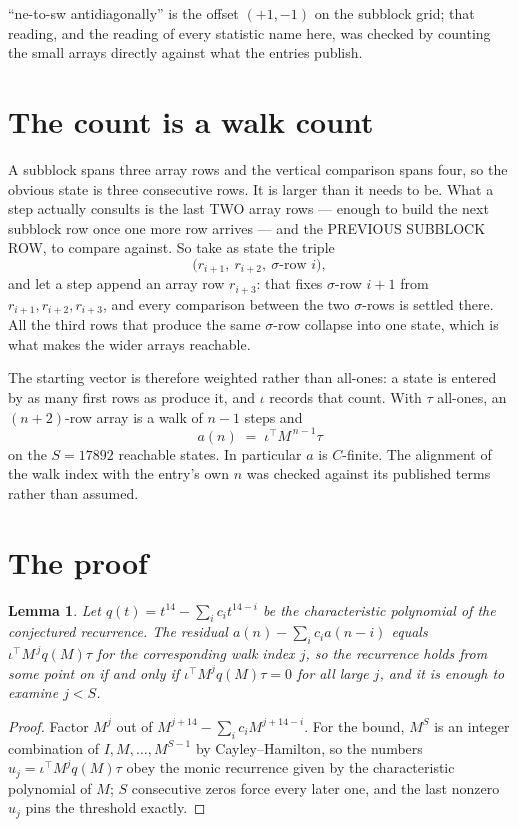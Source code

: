 \documentclass[11pt,a4paper]{article}
\theoremstyle{plain}
\newtheorem{lemma}[theorem]{Lemma}
\theoremstyle{definition}
\begin{document}
``ne-to-sw antidiagonally'' is the offset $(+1,-1)$ on the subblock grid; that reading, and
the reading of every statistic name here, was checked by counting the small arrays directly
against what the entries publish.

\section{The count is a walk count}

A subblock spans three array rows and the vertical comparison spans four, so the obvious state
is three consecutive rows. It is larger than it needs to be. What a step actually consults is
the last TWO array rows --- enough to build the next subblock row once one more row arrives ---
and the PREVIOUS SUBBLOCK ROW, to compare against. So take as state the triple
\[
\bigl(r_{i+1},\ r_{i+2},\ \sigma\text{-row }i\bigr),
\]
and let a step append an array row $r_{i+3}$: that fixes $\sigma$-row $i+1$ from
$r_{i+1},r_{i+2},r_{i+3}$, and every comparison between the two $\sigma$-rows is settled
there. All the third rows that produce the same $\sigma$-row collapse into one state, which is
what makes the wider arrays reachable.

The starting vector is therefore weighted rather than all-ones: a state is entered by as many
first rows as produce it, and $\iota$ records that count. With $\tau$ all-ones, an
$(n+2)$-row array is a walk of $n-1$ steps and
\[
a(n)\;=\;\iota^{\!\top}M^{\,n-1}\tau
\]
on the $S=17892$ reachable states. In particular $a$ is $C$-finite. The alignment of the walk
index with the entry's own $n$ was checked against its published terms rather than assumed.

\section{The proof}

\begin{lemma}\label{lem:crit}
Let $q(t)=t^{14}-\sum_i c_it^{14-i}$ be the characteristic polynomial of the
conjectured recurrence. The residual $a(n)-\sum_ic_ia(n-i)$ equals
$\iota^{\!\top}M^{\,j}q(M)\tau$ for the corresponding walk index $j$, so the recurrence
holds from some point on if and only if $\iota^{\!\top}M^{j}q(M)\tau=0$ for all large $j$,
and it is enough to examine $j<S$.
\end{lemma}

\begin{proof}
Factor $M^{j}$ out of $M^{j+14}-\sum_ic_iM^{j+14-i}$. For the bound, $M^{S}$
is an integer combination of $I,M,\dots,M^{S-1}$ by Cayley--Hamilton, so the numbers
$u_j=\iota^{\!\top}M^{j}q(M)\tau$ obey the monic recurrence given by the characteristic
polynomial of $M$; $S$ consecutive zeros force every later one, and the last nonzero $u_j$
pins the threshold exactly.
\end{proof}
\end{document}
